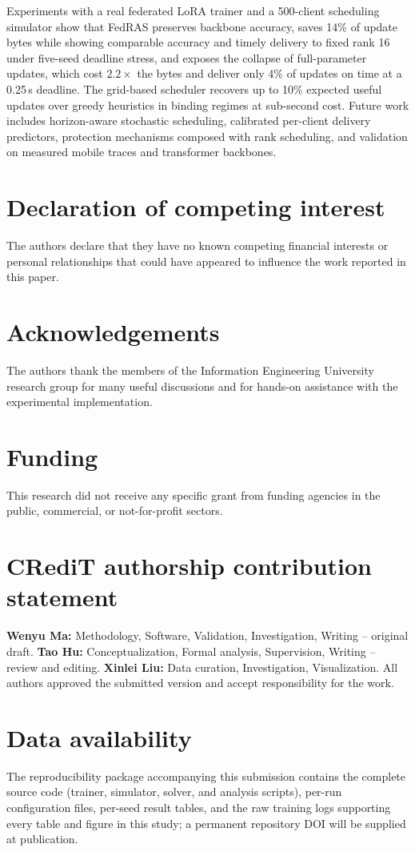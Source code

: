 \documentclass[preprint,12pt]{elsarticle}
\begin{document}
Experiments with a real federated LoRA trainer and a 500-client scheduling simulator show that FedRAS preserves backbone accuracy, saves 14\% of update bytes while showing comparable accuracy and timely delivery to fixed rank 16 under five-seed deadline stress, and exposes the collapse of full-parameter updates, which cost $2.2\times$ the bytes and deliver only 4\% of updates on time at a 0.25\,s deadline. The grid-based scheduler recovers up to 10\% expected useful updates over greedy heuristics in binding regimes at sub-second cost. Future work includes horizon-aware stochastic scheduling, calibrated per-client delivery predictors, protection mechanisms composed with rank scheduling, and validation on measured mobile traces and transformer backbones.

\section*{Declaration of competing interest}
The authors declare that they have no known competing financial interests or personal relationships that could have appeared to influence the work reported in this paper.

\section*{Acknowledgements}
The authors thank the members of the Information Engineering University research group for many useful discussions and for hands-on assistance with the experimental implementation.

\section*{Funding}
This research did not receive any specific grant from funding agencies in the public, commercial, or not-for-profit sectors.

\section*{CRediT authorship contribution statement}
\textbf{Wenyu Ma:} Methodology, Software, Validation, Investigation, Writing -- original draft.
\textbf{Tao Hu:} Conceptualization, Formal analysis, Supervision, Writing -- review and editing.
\textbf{Xinlei Liu:} Data curation, Investigation, Visualization.
All authors approved the submitted version and accept responsibility for the work.

\section*{Data availability}
The reproducibility package accompanying this submission contains the complete source code (trainer, simulator, solver, and analysis scripts), per-run configuration files, per-seed result tables, and the raw training logs supporting every table and figure in this study; a permanent repository DOI will be supplied at publication.
\end{document}

